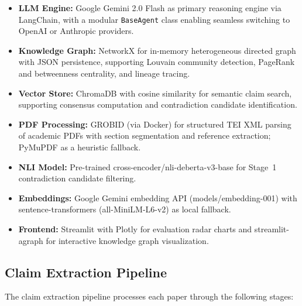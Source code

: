 \begin{itemize}
    \item \textbf{LLM Engine:} Google Gemini 2.0 Flash as primary reasoning engine via LangChain, with a modular \texttt{BaseAgent} class enabling seamless switching to OpenAI or Anthropic providers.
    \item \textbf{Knowledge Graph:} NetworkX for in-memory heterogeneous directed graph with JSON persistence, supporting Louvain community detection, PageRank and betweenness centrality, and lineage tracing.
    \item \textbf{Vector Store:} ChromaDB with cosine similarity for semantic claim search, supporting consensus computation and contradiction candidate identification.
    \item \textbf{PDF Processing:} GROBID (via Docker) for structured TEI XML parsing of academic PDFs with section segmentation and reference extraction; PyMuPDF as a heuristic fallback.
    \item \textbf{NLI Model:} Pre-trained cross-encoder/nli-deberta-v3-base for Stage~1 contradiction candidate filtering.
    \item \textbf{Embeddings:} Google Gemini embedding API (models/embedding-001) with sentence-transformers (all-MiniLM-L6-v2) as local fallback.
    \item \textbf{Frontend:} Streamlit with Plotly for evaluation radar charts and streamlit-agraph for interactive knowledge graph visualization.
\end{itemize}

\subsection{Claim Extraction Pipeline}

The claim extraction pipeline processes each paper through the following stages:

